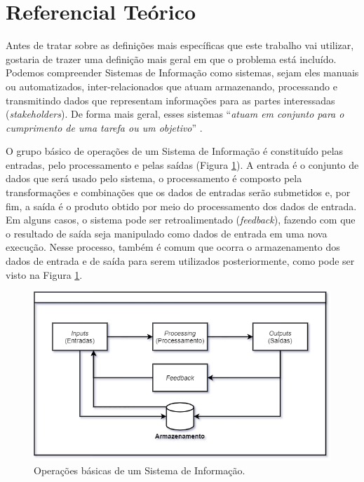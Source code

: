 \section{Referencial Teórico}
\label{sec:referencialTeorico}

Antes de tratar sobre as definições mais específicas que este trabalho vai utilizar, gostaria de trazer uma definição mais geral em que o problema está incluído. Podemos compreender Sistemas de Informação como sistemas, sejam eles manuais ou automatizados, inter-relacionados que atuam armazenando, processando e transmitindo dados que representam informações para as partes interessadas (\textit{stakeholders}). De forma mais geral, esses sistemas \enquote{\textit{atuam em conjunto para o cumprimento de uma tarefa ou um objetivo}} \cite{turban2009business}.

O grupo básico de operações de um Sistema de Informação é constituído pelas entradas, pelo processamento e pelas saídas (Figura \ref{fig:operacoesBasicaSistemas}). A entrada é o conjunto de dados que será usado pelo sistema, o processamento é composto pela transformações e combinações que os dados de entradas serão submetidos e, por fim, a saída é o produto obtido por meio do processamento dos dados de entrada. Em alguns casos, o sistema pode ser retroalimentado (\textit{feedback}), fazendo com que o resultado de saída seja manipulado como dados de entrada em uma nova execução. Nesse processo, também é comum que ocorra o armazenamento dos dados de entrada e de saída para serem utilizados posteriormente, como pode ser visto na Figura \ref{fig:operacoesBasicaSistemas}.

\begin{figure}[ht]
\centering
\includegraphics[width=1\textwidth]{imagens/operacoes-basicas-sistema-informacao.png}
\caption{Operações básicas de um Sistema de Informação.}
\label{fig:operacoesBasicaSistemas}
\end{figure}

